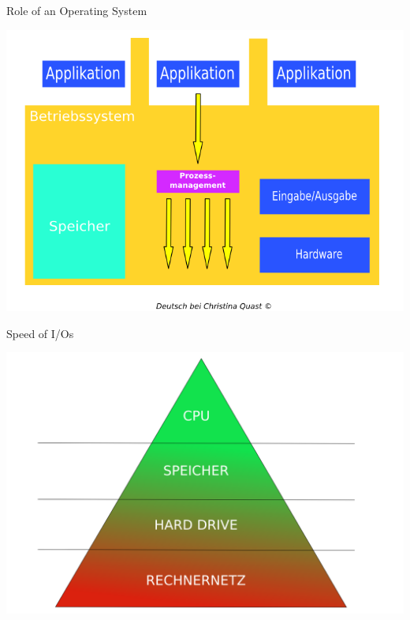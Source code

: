 {  \begin{frame}{Role of an Operating System}
    \begin{center}
      \includegraphics[scale=0.3]{img/operating-system.png}
    \end{center}
  \end{frame}

  \begin{frame}{Speed of I/Os}
    \begin{center}
      \includegraphics[scale=0.3]{img/pyramid-io.png}
    \end{center}
  \end{frame}

}
